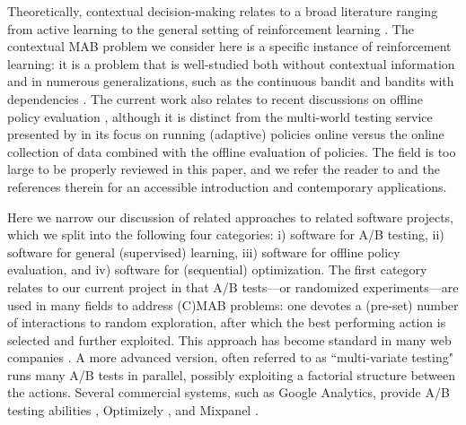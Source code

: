 \documentclass[nojss]{jss}
\begin{document}
Theoretically, contextual decision-making relates to a broad literature ranging from active learning  \citep[e.g.,][]{beygelzimer2010agnostic, hanneke2014theory} to the general setting of reinforcement learning \citep{sutton1998introduction, szepesvari2010algorithms}. The contextual MAB problem \citep{Dudik2011a, Li2010b,agarwal2014taming} we consider here is a specific instance of reinforcement learning: it is a problem that is well-studied both without contextual information \citep{berry1985bandit} and in numerous generalizations, such as the continuous bandit \citep{mandelbaum1987continuous} and bandits with dependencies \citep{pandey2007multi}. The current work also relates to recent discussions on offline policy evaluation \citep{dudik2012sample, langford2011doubly}, although it is distinct from the multi-world testing service presented by \citet{agarwal2016making} in its focus on running (adaptive) policies online versus the online collection of data combined with the offline evaluation of policies. The field is too large to be properly reviewed in this paper, and we refer the reader to \citet{schwartz2017customer} and the references therein for an accessible introduction and contemporary applications.

Here we narrow our discussion of related approaches to related software projects, which we split into the following four categories: i) software for A/B testing, ii) software for general (supervised) learning, iii) software for offline policy evaluation, and iv) software for (sequential) optimization. The first category relates to our current project in that A/B tests---or randomized experiments---are used in many fields to address (C)MAB problems: one devotes a (pre-set) number of interactions to random exploration, after which the best performing action is selected and further exploited. This approach has become standard in many web companies \citep{jiang2016framework}. A more advanced version, often referred to as ``multi-variate testing" runs many A/B tests in parallel, possibly exploiting a factorial structure between the actions. Several commercial systems, such as Google Analytics, provide A/B testing abilities \citep{googleanalytics},  Optimizely \citep{optimizely}, and Mixpanel \citep{mixpanel}.
\end{document}

